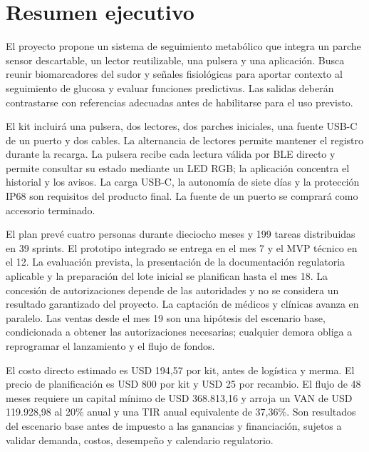 \clearpage
\section{Resumen ejecutivo}
El proyecto propone un sistema de seguimiento metabólico que integra un parche sensor descartable, un lector reutilizable, una pulsera y una aplicación. Busca reunir biomarcadores del sudor y señales fisiológicas para aportar contexto al seguimiento de glucosa y evaluar funciones predictivas. Las salidas deberán contrastarse con referencias adecuadas antes de habilitarse para el uso previsto.

El kit incluirá una pulsera, dos lectores, dos parches iniciales, una fuente USB-C de un puerto y dos cables. La alternancia de lectores permite mantener el registro durante la recarga. La pulsera recibe cada lectura válida por BLE directo y permite consultar su estado mediante un LED RGB; la aplicación concentra el historial y los avisos. La carga USB-C, la autonomía de siete días y la protección IP68 son requisitos del producto final. La fuente de un puerto se comprará como accesorio terminado.

El plan prevé cuatro personas durante dieciocho meses y 199 tareas distribuidas en 39 sprints. El prototipo integrado se entrega en el mes 7 y el MVP técnico en el 12. La evaluación prevista, la presentación de la documentación regulatoria aplicable y la preparación del lote inicial se planifican hasta el mes 18. La concesión de autorizaciones depende de las autoridades y no se considera un resultado garantizado del proyecto. La captación de médicos y clínicas avanza en paralelo. Las ventas desde el mes 19 son una hipótesis del escenario base, condicionada a obtener las autorizaciones necesarias; cualquier demora obliga a reprogramar el lanzamiento y el flujo de fondos.

El costo directo estimado es USD 194,57 por kit, antes de logística y merma. El precio de planificación es USD 800 por kit y USD 25 por recambio. El flujo de 48 meses requiere un capital mínimo de USD 368.813,16 y arroja un VAN de USD 119.928,98 al 20\% anual y una TIR anual equivalente de 37,36\%. Son resultados del escenario base antes de impuesto a las ganancias y financiación, sujetos a validar demanda, costos, desempeño y calendario regulatorio.
